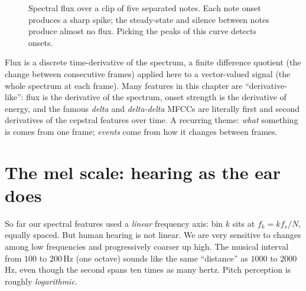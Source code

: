 \begin{figure}[H]
\centering
{}
\caption{Spectral flux over a clip of five separated notes. Each note onset
produces a sharp spike; the steady-state and silence between notes produce almost
no flux. Picking the peaks of this curve detects onsets.}
\label{ch27:fig-flux}
\end{figure}

\begin{connectionbox}
Flux is a discrete time-derivative of the spectrum, a finite difference quotient (the change between consecutive frames)
applied here to a vector-valued
signal (the whole spectrum at each frame). Many features in this chapter are
``derivative-like'': flux is the derivative of the spectrum, onset strength is the
derivative of energy, and the famous \emph{delta} and \emph{delta-delta} MFCCs are
literally first and second derivatives of the cepstral features over time. A
recurring theme: \emph{what} something is comes from one frame; \emph{events}
come from how it changes between frames.
\end{connectionbox}

\section{The mel scale: hearing as the ear does}
\label{ch27:mel}

So far our spectral features used a \emph{linear} frequency axis: bin $k$ sits at
$f_k = k f_s/N$, equally spaced. But human hearing is not linear. We are
very sensitive to changes among low frequencies and progressively coarser
up high. The musical interval from $100$ to $200$\,Hz (one octave) sounds like the
same ``distance'' as $1000$ to $2000$\,Hz, even though the second spans ten times
as many hertz. Pitch perception is roughly \emph{logarithmic}.

